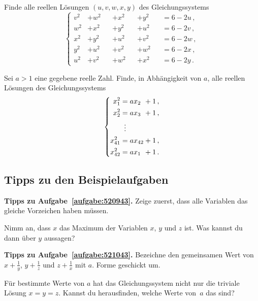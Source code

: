 \begin{aufgabe*}\label{aufgabe:Sayda2013}
	Finde alle reellen Lösungen $(u,v,w,x,y)$ des Gleichungssystems
	\begin{equation*}
		\left\{\begin{alignedat}{4}
			v^2&+w^2&&+x^2&&+y^2 &&= 6-2u\,,\\
			w^2&+x^2&&+y^2&&+u^2 &&= 6-2v\,,\\
			x^2&+y^2&&+u^2&&+v^2 &&= 6-2w\,,\\
			y^2&+u^2&&+v^2&&+w^2 &&= 6-2x\,,\\
			u^2&+v^2&&+w^2&&+x^2 &&= 6-2y\,.
		\end{alignedat}\right.
	\end{equation*}
\end{aufgabe*}
\begin{aufgabe*}[*]\label{aufgabe:IMOSL1993VNM}
	Sei $a>1$ eine gegebene reelle Zahl. Finde, in Abhängigkeit von $a$, alle reellen Lösungen des Gleichungssystems
	\begin{equation*}
		\left\{\begin{alignedat}{2}
			x_1^2 &= ax_2&&+1\,,\\
			x_2^2 &= ax_3&&+1\,,\\
			&\mathrel{\tikz[inner sep=0,outer sep=0]{\node at (0,-0.5ex) {$\phantom{=}$};\node at (0,0) {$\vdots$};}}\\
			x_{41}^2 &= ax_{42}&&+1\,,\\
			x_{42}^2 &= ax_1&&+1\,.
		\end{alignedat}\right.
	\end{equation*}
\end{aufgabe*}

\subsection*{Tipps zu den Beispielaufgaben}
\textbf{Tipps zu Aufgabe~\ref{aufgabe:520943}.} Zeige zuerst, dass alle Variablen das gleiche Vorzeichen haben müssen.

Nimm an, dass $x$ das Maximum der Variablen $x$, $y$ und $z$ ist. Was kannst du dann über $y$ aussagen?

\textbf{Tipps zu Aufgabe~\ref{aufgabe:521043}.} Bezeichne den gemeinsamen Wert von $x+\frac 1y$, $y+\frac 1z$ und $z+\frac 1x$ mit $a$. Forme geschickt um.

Für bestimmte Werte von $a$ hat das Gleichungssystem nicht nur die triviale Lösung $x=y=z$. Kannst du herausfinden, welche Werte von~$a$ das sind?

